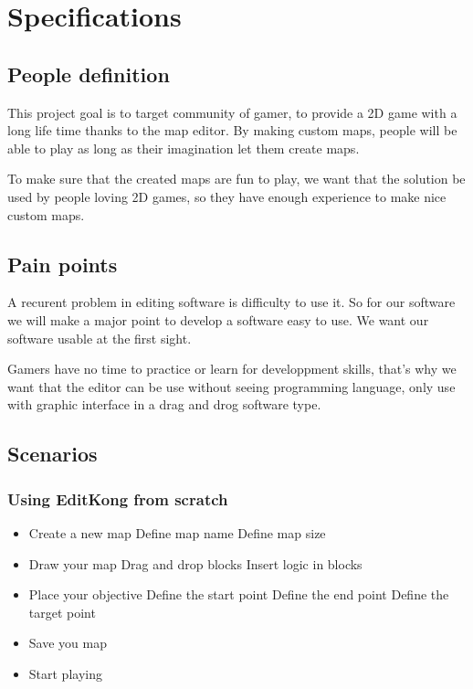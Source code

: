 \newpage
\thispagestyle{empty}

\chapter{Specifications}

\section{People definition}

This project goal is to target community of gamer, to provide a 2D game with a long life time thanks to the map editor. By making custom maps, people will be able to play as long as their imagination let them create maps.

To make sure that the created maps are fun to play, we want that the solution be used by people loving 2D games, so they have enough experience to make nice custom maps.

\section{Pain points}

A recurent problem in editing software is difficulty to use it. So for our software we will make a major point to develop a software easy to use. We want our software usable at the first sight.

Gamers have no time to practice or learn for developpment skills, that's why we want that the editor can be use without seeing programming language, only use with graphic interface in a drag and drog software type.

\newpage
\section{Scenarios}

\subsection{Using EditKong from scratch}

\begin{itemize}
\item Create a new map
\subitem Define map name 
\subitem Define map size
\item Draw your map
\subitem Drag and drop blocks
\subitem Insert logic in blocks
\item Place your objective
\subitem Define the start point
\subitem Define the end point
\subitem Define the target point
\item Save you map
\item Start playing
\end{itemize}

